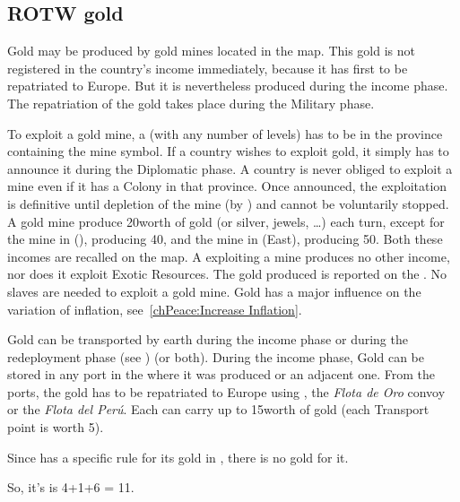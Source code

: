 \subsection{ROTW gold}
\begin{note} Gold may be produced by gold mines located in the \ROTW
  map. This gold is not registered in the country's income immediately,
  because it has first to be repatriated to Europe. But it is
  nevertheless produced during the income phase. The repatriation of the
  gold takes place during the Military phase.
\end{note}
\aparag To exploit a gold mine, a \COL (with any number of levels) has
to be in the province containing the mine symbol. If a country wishes to
exploit gold, it simply has to announce it during the Diplomatic phase.
\bparag A country is never obliged to exploit a mine even if it has a
Colony in that province.
\bparag Once announced, the exploitation is definitive until depletion
of the mine (by ) and cannot be voluntarily
stopped.
\bparag A \ROTW gold mine produce 20\ducats worth of gold (or silver,
jewels, \ldots) each turn, except for the mine in \villeTenochtitlan
(\granderegionAzteca), producing 40\ducats, and the mine in
\bazarPotosi (\granderegionInca East), producing 50\ducats. Both
these incomes are recalled on the map.
\bparag\label{chIncomes:Gold Colonies} A \COL exploiting a mine produces no
other income, nor does it exploit Exotic Resources. The gold produced is
reported on the .
\bparag No slaves are needed to exploit a gold mine.
\bparag Gold has a major influence on the variation of inflation,
see~\ref{chPeace:Increase Inflation}.

\aparag \label{chIncomes:Gold Production} Gold can be transported by
earth during the income phase or during the redeployment phase (see
) (or both).
\bparag During the income phase, Gold can be stored in any port \COL in
the \Area where it was produced or an adjacent one.
\bparag From the ports, the gold has to be repatriated to Europe using
\NTD, the \emph{Flota de Oro} convoy or the \emph{Flota del
  Per\'u}. Each \NTD can carry up to 15\ducats worth of gold (each
Transport point is worth 5\ducats).

\begin{exemple}
  Since \POR has a specific rule for its gold in \constructionElmina,
  there is no \ROTW gold for it.

  So, it's  is 4+1+6 = 11\ducats.
\end{exemple}

